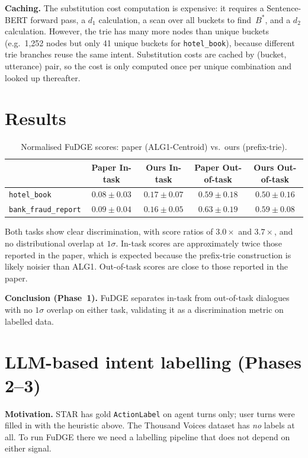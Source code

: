 \documentclass[11pt,a4paper]{article}
\begin{document}
\textbf{Caching.} The substitution cost computation is expensive: it requires a Sentence-BERT forward pass, a $d_1$ calculation, a scan over all buckets to find~$B^*$, and a $d_2$ calculation. However, the trie has many more nodes than unique buckets (e.g.\ 1,252 nodes but only 41 unique buckets for \texttt{hotel\_book}), because different trie branches reuse the same intent. Substitution costs are cached by (bucket, utterance) pair, so the cost is only computed once per unique combination and looked up thereafter.

\section{Results}

\begin{table}[h]
\centering
\begin{tabular}{lcccc}
\toprule
& \textbf{Paper In-task} & \textbf{Ours In-task} & \textbf{Paper Out-of-task} & \textbf{Ours Out-of-task} \\
\midrule
\texttt{hotel\_book} & $0.08 \pm 0.03$ & $0.17 \pm 0.07$ & $0.59 \pm 0.18$ & $0.50 \pm 0.16$ \\
\texttt{bank\_fraud\_report} & $0.09 \pm 0.04$ & $0.16 \pm 0.05$ & $0.63 \pm 0.19$ & $0.59 \pm 0.08$ \\
\bottomrule
\end{tabular}
\caption{Normalised FuDGE scores: paper (ALG1-Centroid) vs.\ ours (prefix-trie).}
\end{table}

Both tasks show clear discrimination, with score ratios of $3.0\times$ and $3.7\times$, and no distributional overlap at $1\sigma$. In-task scores are approximately twice those reported in the paper, which is expected because the prefix-trie construction is likely noisier than ALG1. Out-of-task scores are close to those reported in the paper.

\textbf{Conclusion (Phase~1).} FuDGE separates in-task from out-of-task dialogues with no $1\sigma$ overlap on either task, validating it as a discrimination metric on labelled data.

\section{LLM-based intent labelling (Phases 2--3)}

\textbf{Motivation.} STAR has gold \texttt{ActionLabel} on agent turns only; user turns were filled in with the heuristic above. The Thousand Voices dataset has \emph{no} labels at all. To run FuDGE there we need a labelling pipeline that does not depend on either signal.
\end{document}

